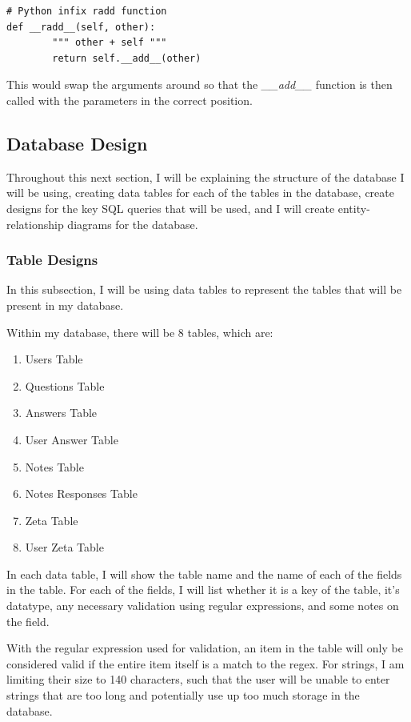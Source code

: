 \documentclass[12pt]{article}
\begin{document}
\begin{lstlisting}
# Python infix radd function
def __radd__(self, other):
        """ other + self """
        return self.__add__(other)
\end{lstlisting}

This would swap the arguments around so that the \textit{\_\_add\_\_} function is then called with the parameters in the correct position.

\clearpage
\subsection{Database Design}

Throughout this next section, I will be explaining the structure of the database I will be using, creating data tables for each of the tables in the database, create designs for the key SQL queries that will be used, and I will create entity-relationship diagrams for the database.

\subsubsection{Table Designs}
In this subsection, I will be using data tables to represent the tables that will be present in my database.

Within my database, there will be 8 tables, which are:

\begin{enumerate}
    \item Users Table
    \item Questions Table
    \item Answers Table
    \item User Answer Table
    \item Notes Table
    \item Notes Responses Table
    \item Zeta Table
    \item User Zeta Table
\end{enumerate}

In each data table, I will show the table name and the name of each of the fields in the table. For each of the fields, I will list whether it is a key of the table, it's datatype, any necessary validation using regular expressions, and some notes on the field.

With the regular expression used for validation, an item in the table will only be considered valid if the entire item itself is a match to the regex. For strings, I am limiting their size to 140 characters, such that the user will be unable to enter strings that are too long and potentially use up too much storage in the database.
\end{document}
